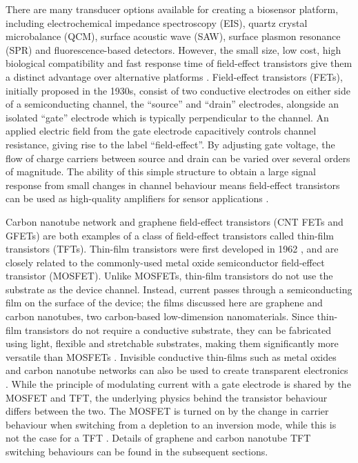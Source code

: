 \documentclass[
  a4paper,
]{scrbook}
\begin{document}
There are many transducer options available for creating a biosensor
platform, including electrochemical impedance spectroscopy (EIS), quartz
crystal microbalance (QCM), surface acoustic wave (SAW), surface plasmon
resonance (SPR) and fluorescence-based detectors. However, the small
size, low cost, high biological compatibility and fast response time of
field-effect transistors give them a distinct advantage over alternative
platforms \autocite{Khan2020,Shkodra2021,Hirata2021}. Field-effect
transistors (FETs), initially proposed in the 1930s, consist of two
conductive electrodes on either side of a semiconducting channel, the
``source'' and ``drain'' electrodes, alongside an isolated ``gate''
electrode which is typically perpendicular to the channel. An applied
electric field from the gate electrode capacitively controls channel
resistance, giving rise to the label ``field-effect''. By adjusting gate
voltage, the flow of charge carriers between source and drain can be
varied over several orders of magnitude. The ability of this simple
structure to obtain a large signal response from small changes in
channel behaviour means field-effect transistors can be used as
high-quality amplifiers for sensor applications
\autocite{Kauffman2008,Petti2016,Tran2016,Shkodra2021,Yao2021}.

Carbon nanotube network and graphene field-effect transistors (CNT FETs
and GFETs) are both examples of a class of field-effect transistors
called thin-film transistors (TFTs). Thin-film transistors were first
developed in 1962 \autocite{Weimer1962}, and are closely related to the
commonly-used metal oxide semiconductor field-effect transistor
(MOSFET). Unlike MOSFETs, thin-film transistors do not use the substrate
as the device channel. Instead, current passes through a semiconducting
film on the surface of the device; the films discussed here are graphene
and carbon nanotubes, two carbon-based low-dimension nanomaterials.
Since thin-film transistors do not require a conductive substrate, they
can be fabricated using light, flexible and stretchable substrates,
making them significantly more versatile than MOSFETs
\autocite{Kauffman2008,Cao2009,Petti2016,Shkodra2021}. Invisible
conductive thin-films such as metal oxides and carbon nanotube networks
can also be used to create transparent electronics \autocite{Cao2009}.
While the principle of modulating current with a gate electrode is
shared by the MOSFET and TFT, the underlying physics behind the
transistor behaviour differs between the two. The MOSFET is turned on by
the change in carrier behaviour when switching from a depletion to an
inversion mode, while this is not the case for a TFT
\autocite{Petti2016}. Details of graphene and carbon nanotube TFT
switching behaviours can be found in the subsequent sections.
\end{document}
